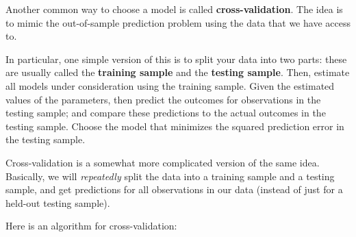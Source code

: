 \documentclass[
  letterpaper,
  DIV=11,
  numbers=noendperiod]{scrreprt}
\begin{document}
Another common way to choose a model is called
\textbf{cross-validation}. The idea is to mimic the out-of-sample
prediction problem using the data that we have access to.

In particular, one simple version of this is to split your data into two
parts: these are usually called the \textbf{training sample} and the
\textbf{testing sample}. Then, estimate all models under consideration
using the training sample. Given the estimated values of the parameters,
then predict the outcomes for observations in the testing sample; and
compare these predictions to the actual outcomes in the testing sample.
Choose the model that minimizes the squared prediction error in the
testing sample.

Cross-validation is a somewhat more complicated version of the same
idea. Basically, we will \emph{repeatedly} split the data into a
training sample and a testing sample, and get predictions for all
observations in our data (instead of just for a held-out testing
sample).

Here is an algorithm for cross-validation:
\end{document}
